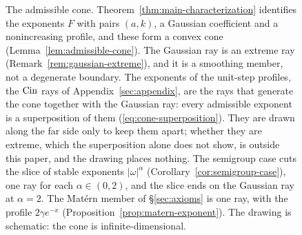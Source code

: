 
\begin{figure}[t]
\centering
{}
\caption{The admissible cone. Theorem~\ref{thm:main-characterization} identifies the
exponents $F$ with pairs $(a,k)$, a Gaussian coefficient and a nonincreasing profile, and
these form a convex cone (Lemma~\ref{lem:admissible-cone}). The Gaussian ray is an extreme
ray (Remark~\ref{rem:gaussian-extreme}), and it is a smoothing member, not a
degenerate boundary. The exponents of the unit-step profiles, the $\operatorname{Cin}$ rays of
Appendix~\ref{sec:appendix}, are the rays that generate the cone together with the Gaussian
ray: every admissible exponent is a superposition of them
(\ref{eq:cone-superposition}). They are drawn along the far side only to keep them apart;
whether they are extreme, which the superposition alone does not show, is outside this
paper, and the drawing places nothing. The semigroup case cuts the
slice of stable exponents $|\omega|^\alpha$ (Corollary~\ref{cor:semigroup-case}), one ray
for each $\alpha \in (0,2)$, and the slice ends on the Gaussian ray at $\alpha = 2$. The
Mat\'ern member of \S\ref{sec:axioms} is one ray, with the profile $2\gamma e^{-x}$
(Proposition~\ref{prop:matern-exponent}). The drawing is schematic: the cone is
infinite-dimensional.}
\label{fig:admissible-cone}
\end{figure}
